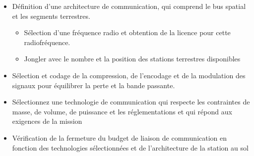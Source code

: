 \begin{itemize}
    \item Définition d'une architecture de communication, qui comprend le bus spatial et les segments terrestres.
    \begin{itemize}
        \item Sélection d'une fréquence radio et obtention de la licence pour cette radiofréquence.
        \item Jongler avec le nombre et la position des stations terrestres disponibles
    \end{itemize}
    \item Sélection et codage de la compression, de l'encodage et de la modulation des signaux pour équilibrer la perte et la bande passante.
    \item Sélectionnez une technologie de communication qui respecte les contraintes de masse, de volume, de puissance et les réglementations et qui répond aux exigences de la mission
    \item Vérification de la fermeture du budget de liaison de communication en fonction des technologies sélectionnées et de l'architecture de la station au sol   
\end{itemize}





